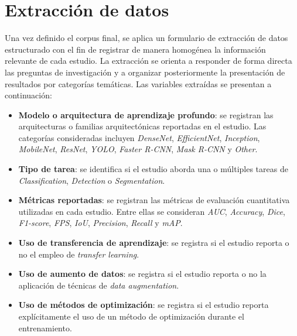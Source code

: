 \section{Extracción de datos}

Una vez definido el corpus final, se aplica un formulario de extracción de datos estructurado con el fin de registrar de manera homogénea la información relevante de cada estudio. La extracción se orienta a responder de forma directa las preguntas de investigación y a organizar posteriormente la presentación de resultados por categorías temáticas. Las variables extraídas se presentan a continuación:

\begin{itemize}
    \item \textbf{Modelo o arquitectura de aprendizaje profundo}: se registran las arquitecturas o familias arquitectónicas reportadas en el estudio. Las categorías consideradas incluyen \textit{DenseNet}, \textit{EfficientNet}, \textit{Inception}, \textit{MobileNet}, \textit{ResNet}, \textit{YOLO}, \textit{Faster R-CNN}, \textit{Mask R-CNN} y \textit{Other}.
    
    \item \textbf{Tipo de tarea}: se identifica si el estudio aborda una o múltiples tareas de \textit{Classification}, \textit{Detection} o \textit{Segmentation}.
    
    \item \textbf{Métricas reportadas}: se registran las métricas de evaluación cuantitativa utilizadas en cada estudio. Entre ellas se consideran \textit{AUC}, \textit{Accuracy}, \textit{Dice}, \textit{F1-score}, \textit{FPS}, \textit{IoU}, \textit{Precision}, \textit{Recall} y \textit{mAP}.
    
    \item \textbf{Uso de transferencia de aprendizaje}: se registra si el estudio reporta o no el empleo de \textit{transfer learning}.
    
    \item \textbf{Uso de aumento de datos}: se registra si el estudio reporta o no la aplicación de técnicas de \textit{data augmentation}.
    
    \item \textbf{Uso de métodos de optimización}: se registra si el estudio reporta explícitamente el uso de un método de optimización durante el entrenamiento.
\end{itemize}
\vspace{-0.5 cm}

